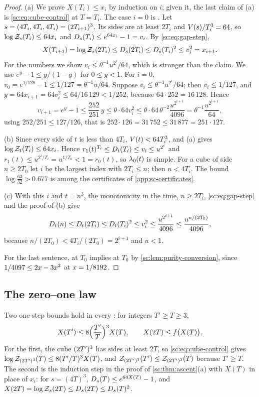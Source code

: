 \begin{proof}
(a) We prove $X(T_i)\le x_i$ by induction on $i$; given it, the last claim of (a) is \eqref{sc:eq:cube-control} at $T=T_i$. The case $i=0$ is \Bcirc{}. Let $s=(4T_i,4T_i,4T_i)=(2T_{i+1})^3$. Its sides are at least $2T_i$ and $V(s)/T_i^3=64$, so $\log\mathcal Z_{s}(T_i)\le64x_i$ and $D_{s}(T_i)\le e^{64x_i}-1=v_i$. By \eqref{sc:eq:gap-step},
\[
X(T_{i+1})=\log\mathcal Z_{s}(2T_i)\le D_{s}(2T_i)\le D_{s}(T_i)^2\le v_i^2=x_{i+1}.
\]
For the numbers we show $v_i\le\theta^{-1}u^{2^i}/64$, which is stronger than the claim. We use $e^y-1\le y/(1-y)$ for $0\le y<1$. For $i=0$, $v_0=e^{1/128}-1\le1/127=\theta^{-1}u/64$. Suppose $v_i\le\theta^{-1}u^{2^i}/64$; then $v_i\le1/127$, and $y=64x_{i+1}=64v_i^2\le64/16\,129<1/252$, because $64\cdot252=16\,128$. Hence
\[
v_{i+1}=e^y-1\le\frac{252}{251}\,y\le\theta\cdot64v_i^2\le\theta\cdot64\,\theta^{-2}\frac{u^{2^{i+1}}}{4096}=\theta^{-1}\frac{u^{2^{i+1}}}{64},
\]
using $252/251\le127/126$, that is $252\cdot126=31\,752\le31\,877=251\cdot127$.

(b) Since every side of $t$ is less than $4T_i$, $V(t)<64T_i^3$, and (a) gives $\log\mathcal Z_{t}(T_i)\le64x_i$. Hence $r_1(t)^{T_i}\le D_{t}(T_i)\le v_i\le u^{2^i}$ and $r_1(t)\le u^{2^i/T_i}=u^{1/T_0}<1=r_0(t)$, so $\lambda_0(t)$ is simple. For a cube of side $n\ge2T_0$ let $i$ be the largest index with $2T_i\le n$; then $n<4T_i$. The bound $\log\frac{63}{32}>0.677$ is among the certificates of \cref{app:sc-certificates}.

(c) With this $i$ and $t=n^3$, the monotonicity in the time, $n\ge2T_i$, \eqref{sc:eq:gap-step} and the proof of (b) give
\[
D_{t}(n)\le D_{t}(2T_i)\le D_{t}(T_i)^2\le v_i^2\le\frac{u^{2^{i+1}}}{4096}\le\frac{u^{n/(2T_0)}}{4096},
\]
because $n/(2T_0)<4T_i/(2T_0)=2^{i+1}$ and $u<1$.

For the last sentence, \Mcirc{} at $T_0$ implies \Bcirc{} at $T_0$ by \cref{sc:lem:purity-conversion}, since $1/4097\le2x-3x^2$ at $x=1/8192$.
\end{proof}
\subsection{The zero--one law}

Two one-step bounds hold in every \PSTS{}: for integers $T'\ge T\ge3$,
\begin{equation}\label{sc:eq:one-step}
X(T')\le8\Bigl(\frac{T'}{T}\Bigr)^3X(T),\qquad X(2T)\le f\bigl(X(T)\bigr).
\end{equation}
For the first, the cube $(2T')^3$ has sides at least $2T$, so \eqref{sc:eq:cube-control} gives $\log\mathcal Z_{(2T')^3}(T)\le8(T'/T)^3X(T)$, and $\mathcal Z_{(2T')^3}(T')\le\mathcal Z_{(2T')^3}(T)$ because $T'\ge T$. The second is the induction step in the proof of \cref{sc:thm:ascent}(a) with $X(T)$ in place of $x_i$: for $s=(4T)^3$, $D_{s}(T)\le e^{64X(T)}-1$, and $X(2T)=\log\mathcal Z_{s}(2T)\le D_{s}(2T)\le D_{s}(T)^2$.

